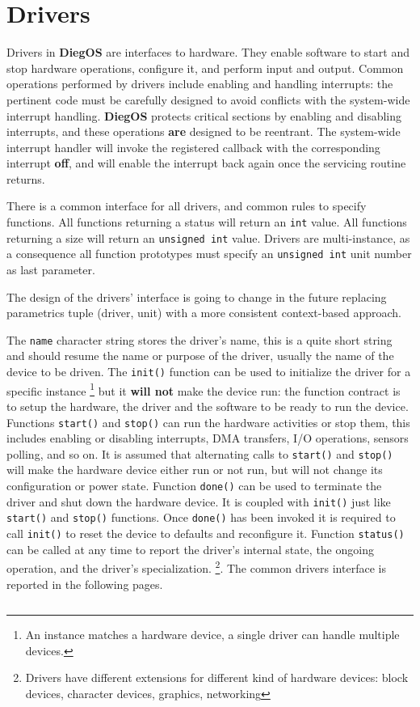 \documentclass[11pt,b5paper]{scrbook}
\newcommand{\myOS}{{\color{SteelBlue}\textbf{DiegOS}}}
\begin{document}
\section{Drivers}
\label{sub:drivers}
Drivers in {\myOS} are interfaces to hardware.
They enable software to start and stop hardware operations, configure it, and perform input and output.
Common operations performed by drivers include enabling and handling interrupts: the pertinent code must
be carefully designed to avoid conflicts with the system-wide interrupt handling.
{\myOS} protects critical sections by enabling and disabling interrupts, and these operations \textbf{are}
designed to be reentrant.
The system-wide interrupt handler will invoke the registered callback with the corresponding interrupt \textbf{off},
and will enable the interrupt back again once the servicing routine returns.

There is a common interface for all drivers, and common rules to specify functions.
All functions returning a status will return an \texttt{int} value.
All functions returning a size will return an \texttt{unsigned int} value.
Drivers are multi-instance, as a consequence all function prototypes must specify an \texttt{unsigned int} unit number
as last parameter.

\begin{warning}
The design of the drivers' interface is going to change in the future replacing parametrics tuple (driver, unit)
with a more consistent context-based approach.
\end{warning}

The \texttt{name} character string stores the driver's name, this is a quite short string and should
resume the name or purpose of the driver, usually the name of the device to be driven.
The \texttt{init()} function can be used to initialize the driver for a specific instance
\footnote{An instance matches a hardware device, a single driver can handle multiple devices.}
but it \textbf{will not} make the device run: the function contract is to setup the hardware, the driver
and the software to be ready to run the device.
Functions \texttt{start()} and \texttt{stop()} can run the hardware activities or stop them, this includes enabling or disabling
interrupts, DMA transfers, I/O operations, sensors polling, and so on.
It is assumed that alternating calls to \texttt{start()} and \texttt{stop()} will make the hardware device either run or not run,
but will not change its configuration or power state.
Function \texttt{done()} can be used to terminate the driver and shut down the hardware device.
It is coupled with \texttt{init()} just like \texttt{start()} and \texttt{stop()} functions.
Once \texttt{done()} has been invoked it is required to call \texttt{init()}
to reset the device to defaults and reconfigure it.
Function \texttt{status()} can be called at any time to report the driver's internal state, the ongoing operation, and the driver's specialization.
\footnote{Drivers have different extensions for different kind of hardware devices: block devices, character devices, graphics, networking}.
The common drivers interface is reported in the following pages.
\newpage
\scriptsize
\inputminted{C}{../include/diegos/drivers_common.h}
\normalsize
\end{document}
